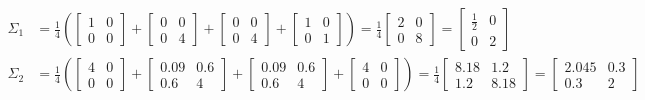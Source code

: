 \documentclass[a4paper, 10pt, twoside]{article}
\begin{document}
\begin{enumerate}[a)]
          \begin{align*}
              \Sigma_1 & = \frac{1}{4}
              \left(
              \begin{bmatrix}1 & 0 \\ 0 & 0\end{bmatrix} +
              \begin{bmatrix}0 & 0 \\ 0 & 4\end{bmatrix} +
              \begin{bmatrix}0 & 0 \\ 0 & 4\end{bmatrix} +
              \begin{bmatrix}1 & 0 \\ 0 & 1\end{bmatrix}
              \right)
              = \frac{1}{4}\begin{bmatrix}2 & 0 \\ 0 & 8\end{bmatrix}
              = \begin{bmatrix}\frac{1}{2} & 0 \\ 0 & 2\end{bmatrix} \\
              \Sigma_2 & = \frac{1}{4}
              \left(
              \begin{bmatrix}4 & 0 \\ 0 & 0\end{bmatrix} +
              \begin{bmatrix}0.09 & 0.6 \\ 0.6 & 4\end{bmatrix} +
              \begin{bmatrix}0.09 & 0.6 \\ 0.6 & 4\end{bmatrix} +
              \begin{bmatrix}4 & 0 \\ 0 & 0\end{bmatrix}
              \right)
              = \frac{1}{4}\begin{bmatrix}8.18 & 1.2 \\ 1.2 & 8.18\end{bmatrix}
              = \begin{bmatrix}2.045 & 0.3 \\ 0.3 & 2\end{bmatrix} \\
          \end{align*}


\end{enumerate}
\end{document}
